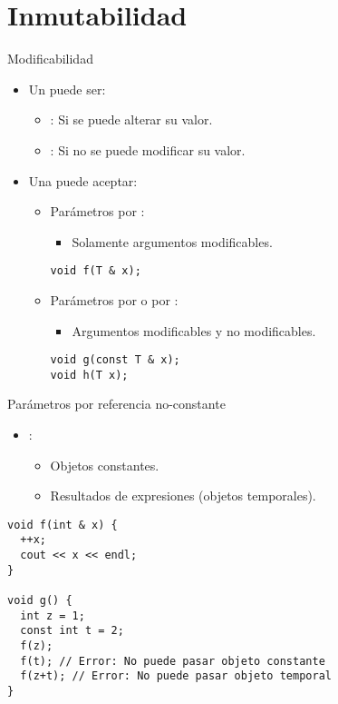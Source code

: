 \section{Inmutabilidad}

\begin{frame}[t,fragile]{Modificabilidad}
\begin{itemize}
  \item Un  puede ser:
    \begin{itemize}
      \item {}: Si se puede alterar su valor.
      \item {}: Si no se puede modificar su valor.
    \end{itemize}

  \item Una  puede aceptar:
    \begin{itemize}
      \item Parámetros por :
        \begin{itemize}
          \item Solamente argumentos modificables.
        \end{itemize}
\begin{lstlisting}
void f(T & x);
\end{lstlisting}

      \item Parámetros por  o por :
        \begin{itemize}
          \item Argumentos modificables y no modificables.
        \end{itemize}
\begin{lstlisting}
void g(const T & x);
void h(T x);
\end{lstlisting}
    \end{itemize}
\end{itemize}
\end{frame}

\begin{frame}[t,fragile]{Parámetros por referencia no-constante}
\begin{itemize}
  \item {}:
    \begin{itemize}
      \item Objetos constantes.
      \item Resultados de expresiones (objetos temporales).
    \end{itemize}
\end{itemize}
\begin{lstlisting}
void f(int & x) {
  ++x;
  cout << x << endl;
}

void g() {
  int z = 1;
  const int t = 2;
  f(z);
  f(t); // Error: No puede pasar objeto constante
  f(z+t); // Error: No puede pasar objeto temporal
}
\end{lstlisting}
\end{frame}

